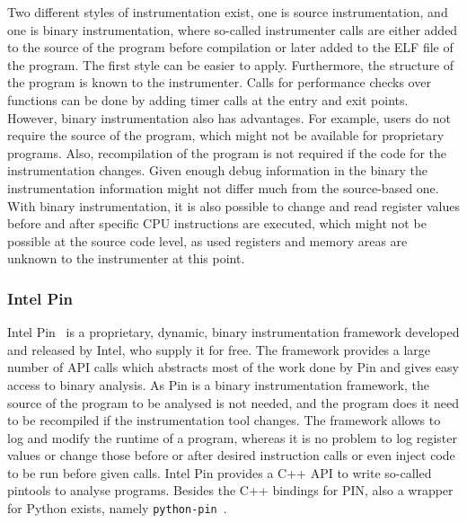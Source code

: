 Two different styles of instrumentation exist, one is source instrumentation,
and one is binary instrumentation, where so-called instrumenter calls are either
added to the source of the program before compilation or later added to the ELF
file of the program. The first style can be easier to apply. Furthermore, the
structure of the program is known to the instrumenter. Calls for performance
checks over functions can be done by adding timer calls at the entry and exit
points. However, binary instrumentation also has advantages. For example, users
do not require the source of the program, which might not be available for
proprietary programs. Also, recompilation of the program is not required if the
code for the instrumentation changes. Given enough debug information in the
binary the instrumentation information might not differ much from the
source-based one. With binary instrumentation, it is also possible to change and
read register values before and after specific CPU instructions are executed,
which might not be possible at the source code level, as used registers and
memory areas are unknown to the instrumenter at this point.

\subsubsection{Intel Pin}

Intel Pin~\cite{pintool} is a proprietary, dynamic, binary instrumentation
framework developed and released by Intel, who supply it for free. The framework
provides a large number of API calls which abstracts most of the work done by
Pin and gives easy access to binary analysis. As Pin is a binary instrumentation
framework, the source of the program to be analysed is not needed, and the
program does it need to be recompiled if the instrumentation tool changes. The
framework allows to log and modify the runtime of a program, whereas it is no
problem to log register values or change those before or after desired
instruction calls or even inject code to be run before given calls. Intel Pin
provides a C++ API to write so-called pintools to analyse programs. Besides the
C++ bindings for PIN, also a wrapper for Python exists, namely
\texttt{python-pin}~\cite{pythonpin}.

